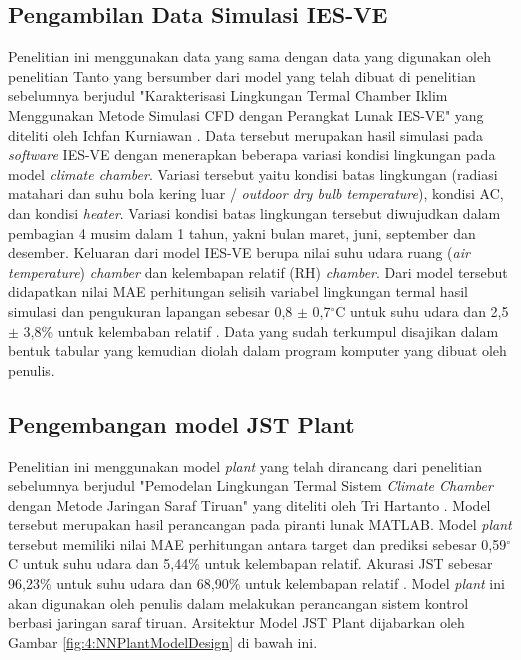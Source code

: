 \subsection{Pengambilan Data Simulasi IES-VE}
Penelitian ini menggunakan data yang sama dengan data yang digunakan oleh penelitian Tanto \cite{skripsiTanto} yang bersumber dari model yang telah dibuat di penelitian sebelumnya berjudul "Karakterisasi Lingkungan Termal Chamber Iklim Menggunakan Metode Simulasi CFD dengan Perangkat Lunak IES-VE" yang diteliti oleh Ichfan Kurniawan \cite{skripsiIchfan}.  Data tersebut merupakan hasil simulasi pada \textit{software} IES-VE dengan menerapkan beberapa variasi kondisi lingkungan pada model \textit{climate chamber}. Variasi tersebut yaitu kondisi batas lingkungan (radiasi matahari dan suhu bola kering luar / \textit{outdoor dry bulb temperature}), kondisi AC, dan kondisi \textit{heater}. Variasi kondisi batas lingkungan tersebut diwujudkan dalam pembagian 4 musim dalam 1 tahun, yakni bulan maret, juni, september dan desember. Keluaran dari model IES-VE berupa nilai suhu udara ruang (\textit{air temperature}) \textit{chamber} dan kelembapan relatif (RH) \textit{chamber}. Dari model tersebut didapatkan nilai MAE perhitungan selisih variabel lingkungan termal hasil simulasi dan pengukuran lapangan sebesar 0,8 $\pm$ 0,7$^{\circ}$C untuk suhu udara dan 2,5 $\pm$ 3,8\% untuk kelembaban relatif \cite{skripsiIchfan}. Data yang sudah terkumpul disajikan dalam bentuk tabular yang kemudian diolah dalam program komputer yang dibuat oleh penulis.

\subsection{Pengembangan model JST Plant}
Penelitian ini menggunakan model \textit{plant} yang telah dirancang dari penelitian sebelumnya berjudul "Pemodelan Lingkungan Termal Sistem \textit{Climate Chamber} dengan Metode Jaringan Saraf Tiruan" yang diteliti oleh Tri Hartanto \cite{skripsiTanto}. Model tersebut merupakan hasil perancangan pada piranti lunak MATLAB. Model \textit{plant} tersebut memiliki nilai MAE perhitungan antara target dan prediksi sebesar 0,59$^{\circ}$C untuk suhu udara dan 5,44\% untuk kelembapan relatif. Akurasi JST sebesar 96,23\% untuk suhu udara dan 68,90\% untuk kelembapan relatif \cite{skripsiTanto}. Model \textit{plant} ini akan digunakan oleh penulis dalam melakukan perancangan sistem kontrol berbasi jaringan saraf tiruan. Arsitektur Model JST Plant dijabarkan oleh Gambar \ref{fig:4:NNPlantModelDesign} di bawah ini.

